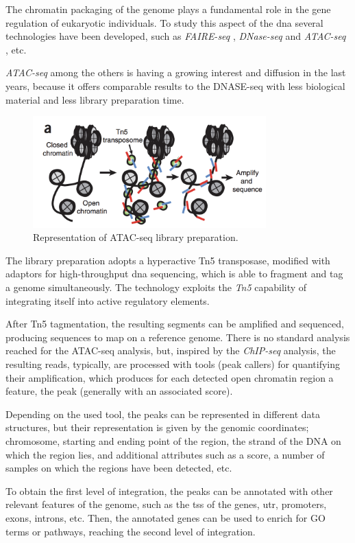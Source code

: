 The chromatin packaging of the genome plays a fundamental role in the gene regulation of eukaryotic individuals.
To study this aspect of the \gls{dna} several technologies have been developed, such as \textit{FAIRE-seq} \cite{Giresi2007}, \textit{DNase-seq} \cite{Winter2013} and \textit{ATAC-seq} \cite{Buenrostro2013}, etc.

\textit{ATAC-seq} among the others is having a growing interest and diffusion in the last years, because it offers comparable results to the DNASE-seq with less biological material and less library preparation time.

\begin{figure}[h]
\centering
\includegraphics[width=9cm,keepaspectratio]{img/intro/atac.png}
\caption[ATAC-seq experiment]{Representation of ATAC-seq library preparation. \cite{Buenrostro2013}}
\label{fig:atacseqexp}
\end{figure}

The library preparation adopts a hyperactive Tn5 transposase, modified with adaptors for high-throughput  \gls{dna} sequencing, which is able to fragment and tag a genome simultaneously.
The technology exploits the \textit{Tn5} capability of integrating itself into active regulatory elements.

After Tn5 tagmentation, the resulting segments can be amplified and sequenced, producing sequences to map on a reference genome.
There is no standard analysis reached for the ATAC-seq analysis, but, inspired by the \textit{ChIP-seq} analysis, the resulting reads, typically, are processed with tools (peak callers) for quantifying their amplification, which produces for each detected open chromatin region a feature, the peak (generally with an associated score). 

Depending on the used tool, the peaks can be represented in different data structures, but their representation is given by the genomic coordinates; chromosome, starting and ending point of the region, the strand of the DNA on which the region lies, and additional attributes such as a score, a number of samples on which the regions have been detected, etc.

To obtain the first level of integration, the peaks can be annotated with other relevant features of the genome, such as the \gls{tss} of the genes, \gls{utr}, promoters, exons, introns, etc.  
Then, the annotated genes can be used to enrich for GO terms or pathways, reaching the second level of integration.




